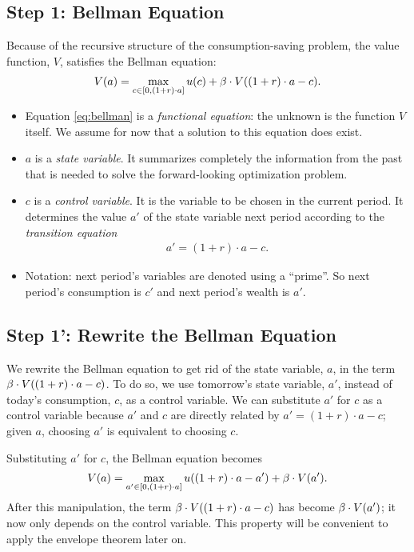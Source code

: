\documentclass[letterpaper,12pt,leqno]{article}
\begin{document}
\subsection{Step 1: Bellman Equation}

Because of the recursive structure of the consumption-saving problem, the value function, $V$, satisfies the Bellman equation:
\begin{align}
 V(a)=\max_{c\in[0,(1+r)\cdot a]}u(c)+\b \cdot V((1+r)\cdot a-c)\label{eq:bellman}.
\end{align}

\begin{itemize}
\item Equation \eqref{eq:bellman} is a \textit{functional equation}: the unknown is the function $V$ itself.  We assume for now that a solution to this equation does exist.
\item $a$ is a \textit{state variable}. It summarizes completely the information from the past that is needed to solve the forward-looking optimization problem.
\item $c$ is a \textit{control variable}. It is the variable to be chosen in the current period. It determines the value $a'$ of the state variable next period according to the \textit{transition equation}
\begin{align*}
a'=(1+r)\cdot a-c.
\end{align*}
\item Notation: next period's variables are denoted using a ``prime''. So next period's consumption is $c'$ and next period's wealth is $a'$.
\end{itemize}

\subsection{Step 1': Rewrite the Bellman Equation}

We rewrite the Bellman equation to get rid of the state variable, $a$, in the term $\beta \cdot  V((1+r)\cdot a-c)$. To do so, we use tomorrow's state variable, $a'$, instead of today's consumption, $c$, as a control variable. We can substitute $a'$ for $c$ as a control variable because $a'$ and $c$ are directly related by $a'=(1+r)\cdot a-c$; given $a$, choosing $a'$ is equivalent to choosing $c$. 

Substituting $a'$ for $c$, the Bellman equation becomes
\begin{equation}
 V(a)=\max_{a'\in[0,(1+r)\cdot a]} u((1+r)\cdot a-a')+\b  \cdot V(a').\label{eq:recursive}
\end{equation}
After this manipulation, the term $\beta \cdot  V((1+r)\cdot a-c)$ has become $\beta \cdot  V(a')$; it now only depends on the control variable. This property will be convenient to apply the envelope theorem later on.
\end{document}
